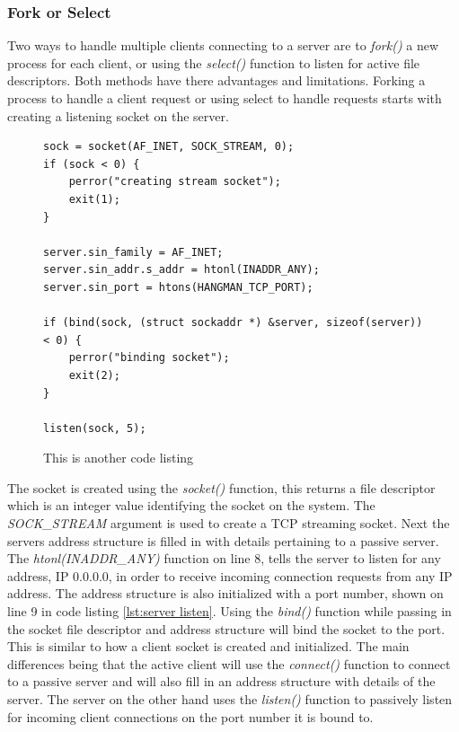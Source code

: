 \documentclass[12pt,a4paper,titlepage]{article}
\begin{document}
\subsubsection{Fork or Select}

Two ways to handle multiple clients connecting to a server are to \textit{fork()} a new process for each client, or using the \textit{select()} function to listen for active file descriptors. Both methods have there advantages and limitations. Forking a process to handle a client request or using select to handle requests starts with creating a listening socket on the server. 

\begin{figure}[H]

\begin{lstlisting}
sock = socket(AF_INET, SOCK_STREAM, 0); 
if (sock < 0) {
	perror("creating stream socket");
	exit(1);
}

server.sin_family = AF_INET;
server.sin_addr.s_addr = htonl(INADDR_ANY);
server.sin_port = htons(HANGMAN_TCP_PORT);

if (bind(sock, (struct sockaddr *) &server, sizeof(server)) < 0) {
	perror("binding socket");
	exit(2);
}

listen(sock, 5);
\end{lstlisting}
	\caption{This is another code listing \cite{stevensunp}}
	\label{code:raig header source}
\end{figure}

The socket is created using the \textit{socket()} function, this returns a file descriptor which is an integer value identifying the socket on the system. The \textit{SOCK\_STREAM} argument is used to create a TCP streaming socket. Next the servers address structure is filled in with details pertaining to a passive server. The \textit{htonl(INADDR\_ANY)} function on line 8, tells the server to listen for any address, IP 0.0.0.0, in order to receive incoming connection requests from any IP address. The address structure is also initialized with a port number, shown on line 9 in code listing \ref{lst:server listen}. Using the \textit{bind()} function while passing in the socket file descriptor and address structure will bind the socket to the port.\\ 

This is similar to how a client socket is created and initialized. The main differences being that the active client will use the \textit{connect()} function to connect to a passive server and will also fill in an address structure with details of the server. The server on the other hand uses the \textit{listen()} function to passively listen for incoming client connections on the port number it is bound to. \\
\end{document}
